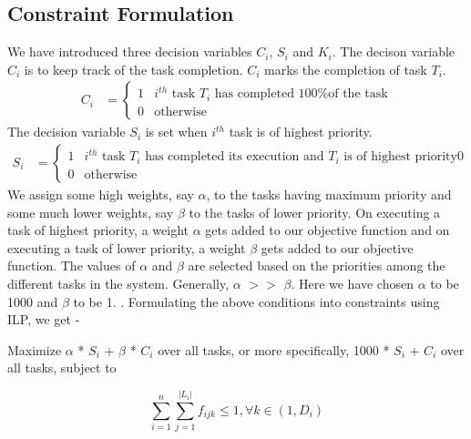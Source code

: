 \subsection{Constraint Formulation}\label{cfp}
We have introduced three decision variables $C_{i}$, $S_{i}$ and $K_{i}$.
The decison variable $C_{i}$ is to keep track of the task completion. $C_{i}$ marks the completion of task $T_{i}$.
\begin{align*}
 C_{i} &=
 \begin{cases}
  1	& \text{$i^{th}$ task $T_{i}$ has completed 100\% of the task} \\
  0	& \text{otherwise}
 \end{cases}
\end{align*}
\newline
\newline
The decision variable $S_{i}$ is set when $i^{th}$ task is of highest priority. 
\begin{align*}
 S_{i} &=
 \begin{cases}
  1	& \text{$i^{th}$ task $T_{i}$ has completed its execution and $T_{i}$ is of highest priority0}\\
  0 	& \text{otherwise}
 \end{cases}
\end{align*}
We assign some high weights, say $\alpha$, to the tasks having maximum priority and some much lower weights, say $\beta$ to 
the tasks of lower priority. On executing a task of highest priority, a weight $\alpha$ gets added to 
our objective function and on executing a task of lower priority, a weight $\beta$ gets added to our objective function. 
\newline
The values of $\alpha$ and $\beta$ are selected based on the priorities among the different tasks in the system. Generally, 
$\alpha$ $>>$ $\beta$. Here we have chosen $\alpha$ to be 1000 and $\beta$ to be 1.
\newline
{}. Formulating the above conditions into constraints using ILP, we get -
\newline
\begin{center}
 Maximize $\alpha$ * $S_{i}$ + $\beta$ * $C_{i}$ over all tasks, or more specifically, 1000 * $S_{i}$ + $C_{i}$ over all tasks,
 subject to
 \end{center}
\begin{equation}\label{eq1}
\sum_{i = 1}^{n}\sum_{j = 1}^{|L_{i}|} f_{ijk} \leq 1, \forall k \in (1,D_{i})
\end{equation}
